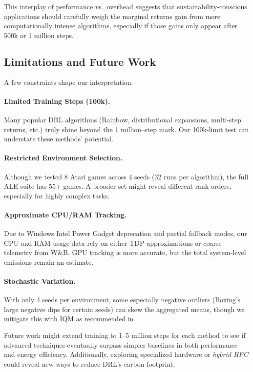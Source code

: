 This interplay of performance vs.\ overhead suggests that sustainability-conscious 
applications should carefully weigh the marginal returns gain from more computationally 
intense algorithms, especially if those gains only appear after 500k or 1 million steps.

\subsection{Limitations and Future Work}
\label{subsec:limitations_futurework}

A few constraints shape our interpretation:

\paragraph{Limited Training Steps (100k).}
Many popular DRL algorithms (Rainbow, distributional expansions, multi-step returns, etc.) 
truly shine beyond the 1 million–step mark. Our 100k-limit test can understate 
these methods’ potential.

\paragraph{Restricted Environment Selection.}
Although we tested 8 Atari games across 4 seeds (32 runs per algorithm), 
the full ALE suite has 55+ games. A broader set might reveal 
different rank orders, especially for highly complex tasks.

\paragraph{Approximate CPU/RAM Tracking.}
Due to Windows Intel Power Gadget deprecation and partial fallback modes, 
our CPU and RAM usage data rely on either TDP approximations or 
coarse telemetry from W\&B. GPU tracking is more accurate, 
but the total system-level emissions remain an estimate.

\paragraph{Stochastic Variation.}
With only 4 seeds per environment, 
some especially negative outliers (Boxing’s large negative dips for certain seeds) 
can skew the aggregated means, 
though we mitigate this with IQM as recommended in~\cite{agarwal:statistical_precipice}.

Future work might extend training to 1--5 million steps for each method 
to see if advanced techniques eventually surpass simpler baselines 
in both performance and energy efficiency. 
Additionally, exploring specialized hardware or \emph{hybrid HPC} 
could reveal new ways to reduce DRL’s carbon footprint.
